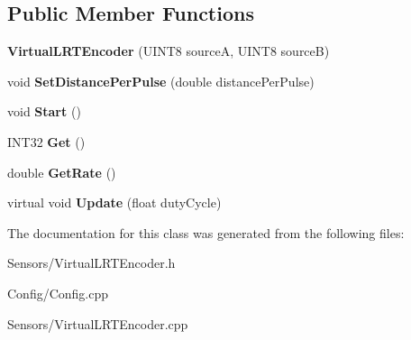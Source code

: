 \subsection*{\-Public \-Member \-Functions}
\begin{DoxyCompactItemize}
\item 
\hypertarget{class_virtual_l_r_t_encoder_a71308091fed85b2e948277b4140120a0}{
{\bfseries \-Virtual\-L\-R\-T\-Encoder} (\-U\-I\-N\-T8 source\-A, \-U\-I\-N\-T8 source\-B)}
\label{class_virtual_l_r_t_encoder_a71308091fed85b2e948277b4140120a0}

\item 
\hypertarget{class_virtual_l_r_t_encoder_ad0667f514fa2f2fa5a2e9aff3f98ef13}{
void {\bfseries \-Set\-Distance\-Per\-Pulse} (double distance\-Per\-Pulse)}
\label{class_virtual_l_r_t_encoder_ad0667f514fa2f2fa5a2e9aff3f98ef13}

\item 
\hypertarget{class_virtual_l_r_t_encoder_a1909aa442eb0313f196ea6a48528b531}{
void {\bfseries \-Start} ()}
\label{class_virtual_l_r_t_encoder_a1909aa442eb0313f196ea6a48528b531}

\item 
\hypertarget{class_virtual_l_r_t_encoder_a1de557cf027b66d0db8d51d233cc4bab}{
\-I\-N\-T32 {\bfseries \-Get} ()}
\label{class_virtual_l_r_t_encoder_a1de557cf027b66d0db8d51d233cc4bab}

\item 
\hypertarget{class_virtual_l_r_t_encoder_a2ea0a59e5403e31566a5929874eab6dc}{
double {\bfseries \-Get\-Rate} ()}
\label{class_virtual_l_r_t_encoder_a2ea0a59e5403e31566a5929874eab6dc}

\item 
\hypertarget{class_virtual_l_r_t_encoder_a2ea9f596488c9f15460c06a3e76df5a4}{
virtual void {\bfseries \-Update} (float duty\-Cycle)}
\label{class_virtual_l_r_t_encoder_a2ea9f596488c9f15460c06a3e76df5a4}

\end{DoxyCompactItemize}


\-The documentation for this class was generated from the following files\-:\begin{DoxyCompactItemize}
\item 
\-Sensors/\-Virtual\-L\-R\-T\-Encoder.\-h\item 
\-Config/\-Config.\-cpp\item 
\-Sensors/\-Virtual\-L\-R\-T\-Encoder.\-cpp\end{DoxyCompactItemize}
